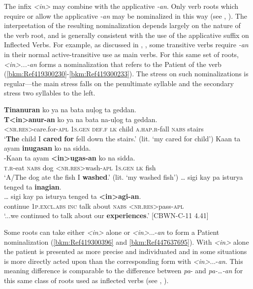 The infix \textit{<in>} may combine with the applicative \textit{{}-an}. Only verb roots which require or allow the applicative \textit{\nobreakdash-an} may be nominalized in this way (see , ). The interpretation of the resulting nominalization depends largely on the nature of the verb root, and is generally consistent with the use of the applicative suffix on Inflected Verbs. For example, as discussed in , , some transitive verbs require \textit{{}-an} in their normal active-transitive use as main verbs. For this same set of roots, \textit{<in>...-an} forms a nominalization that refers to the Patient of the verb (\ref{bkm:Ref419300230}-\ref{bkm:Ref419300233}). The stress on such nominalizations is regular---the main stress falls on the penultimate syllable and the secondary stress two syllables to the left.

\ea
\label{bkm:Ref419300230}
\textbf{Tinanuran}  ko  ya  na  bata  nuļog ta geddan. \\\smallskip
 \gll \textbf{T<in>anur-an}  ko  ya  na  bata  na-uļog ta geddan. \\
<\textsc{nr.res}>care.for-\textsc{apl}  1\textsc{s.gen}  \textsc{def.f}  \textsc{lk}  child  \textsc{a.hap.r}-fall \textsc{nabs} stairs \\
\glt `\textbf{The} child I \textbf{cared} \textbf{for} fell down the stairs.’ (lit. `my cared for child')
\z
\ea
\label{ex:sidda}
Kaan  ta  ayam  \textbf{inugasan}  ko  na  sidda. \\\smallskip
 \gll \emptyset{}-Kaan  ta  ayam  \textbf{<in>ugas-an}  ko  na  sidda. \\
\textsc{t.r}-eat  \textsc{nabs}  dog  <\textsc{nr.res}>wash-\textsc{apl}  1\textsc{s.gen}  \textsc{lk}  fish \\
\glt ‘A/The dog ate the fish I \textbf{washed}.’ (lit. `my washed fish')
\z
\ea
\label{bkm:Ref419300233}
… sigi  kay  pa  isturya  tenged  ta \textbf{inagian}. \\\smallskip
 \gll … sigi  kay  pa  isturya  tenged  ta \textbf{<in>agi-an}. \\
{} continue  1\textsc{p.excl.abs}  \textsc{inc}  talk  about  \textsc{nabs}  <\textsc{nr.res}>pass-\textsc{apl} \\
\glt ‘...we continued to talk about our \textbf{experiences}.’ [CBWN-C-11 4.41]
\z

Some roots can take either \textit{<in>} alone or \textit{<in>}...-\textit{an} to form a Patient nominalization (\ref{bkm:Ref419300396} and \ref{bkm:Ref447637695}). With \textit{<in>} alone the patient is presented as more precise and individuated and in some situations is more directly acted upon than the corresponding form with \textit{<in>}...-\textit{an}. This meaning difference is comparable to the difference between \textit{pa}- and \textit{pa-…-an} for this same class of roots used as inflected verbs (see , ).

